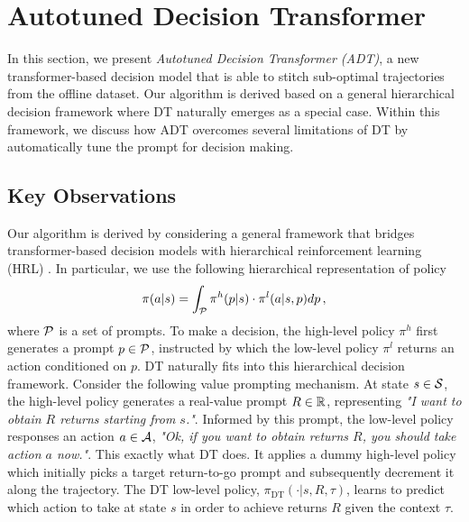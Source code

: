 \section{Autotuned Decision Transformer}


In this section, we present \emph{Autotuned Decision Transformer (ADT)}, a new transformer-based decision model that is able to stitch sub-optimal trajectories from the offline dataset. 
Our algorithm is derived based on a general hierarchical decision framework where DT naturally emerges as a special case. 
Within this framework, we discuss how ADT overcomes several limitations of DT by automatically tune the prompt for decision making. 


\subsection{Key Observations} 
\label{sec:obs}

Our algorithm is derived by considering a general framework that bridges transformer-based decision models with hierarchical reinforcement learning (HRL) \citep{nachum2018data}.  
In particular, 
we use the following hierarchical  representation of policy
\begin{align}
\pi(a | s) = \int_{{\mathcal{P}}} \pi^{h}(p | s) \cdot  \pi^{l} (a | s, p) dp\, ,
\end{align} 
where ${\mathcal{P}}$ is a set of {prompts}. 
To make a decision, the high-level policy $\pi^h$ first generates a prompt $p\in{\mathcal{P}}$, instructed by which the low-level policy $\pi^l$ returns an action conditioned on $p$.  
DT naturally fits into this hierarchical decision framework. 
Consider the following value prompting mechanism. At state $s\in{\mathcal{S}}$, the high-level policy generates a real-value prompt $R\in \mathbb{R}$, representing \emph{"I want to obtain $R$ returns starting from $s$."}. 
Informed by this prompt, the low-level policy responses an action $a\in{\mathcal{A}}$, \emph{"Ok, if you want to obtain returns $R$, you should take action $a$ now."}.  
This exactly what DT does. 
It applies a dummy high-level policy which initially picks a target return-to-go prompt and subsequently decrement it along the trajectory.  
The DT low-level policy, $\pi_{ \mathrm{DT}}(\cdot | s, {R}, \tau)$, learns to predict which action to take at state $s$ in order to achieve returns ${{R}}$ given the context $\tau$.  


